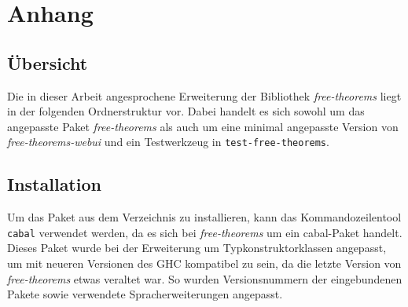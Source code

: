 \section{Anhang}

\subsection*{Übersicht}

Die in dieser Arbeit angesprochene Erweiterung der Bibliothek \textit{free-theorems} liegt in der folgenden
Ordnerstruktur vor. Dabei handelt es sich sowohl um das angepasste Paket \textit{free-theorems} als auch um
eine minimal angepasste Version von \textit{free-theorems-webui} und ein Testwerkzeug in \texttt{test-free-theorems}.
\\



\subsection*{Installation}

Um das Paket aus dem Verzeichnis zu installieren, kann das Kommandozeilentool \texttt{cabal} verwendet werden,
da es sich bei \textit{free-theorems} um ein cabal-Paket handelt. Dieses Paket wurde bei der Erweiterung um
Typkonstruktorklassen angepasst, um mit neueren Versionen des GHC kompatibel zu sein, da die letzte Version
von \textit{free-theorems} etwas veraltet war. So wurden Versionsnummern der eingebundenen Pakete
sowie verwendete Spracherweiterungen angepasst.

